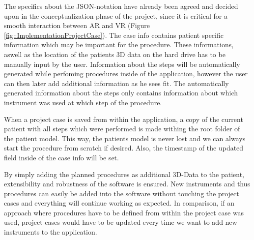 The specifics about the JSON-notation have already been agreed and decided upon in the conceptualization phase of the project, since it is critical for a smooth interaction between AR and VR (Figure \ref{fig::ImplementationProjectCase}). 
The case info contains patient specific information which may be important for the procedure.
These informations, aswell as the location of the patients 3D data on the hard drive has to be manually input by the user.
Information about the steps will be automatically generated while perfoming procedures inside of the application, however the user can then later add additional information as he sees fit.
The automatically generated information about the steps only contains information about which instrument was used at which step of the procedure.

When a project case is saved from within the application, a copy of the current patient with all steps which were performed is made withing the root folder of the patient model.
This way, the patients model is never lost and we can always start the procedure from scratch if desired.
Also, the timestamp of the updated field inside of the case info will be set.

By simply adding the planned procedures as additional 3D-Data to the patient, extensibility and robustness of the software is ensured.
New instruments and thus procedures can easily be added into the software without touching the project cases and everything will continue working as expected.
In comparison, if an approach where procedures have to be defined from within the project case was used, project cases would have to be updated every time we want to add new instruments to the application.